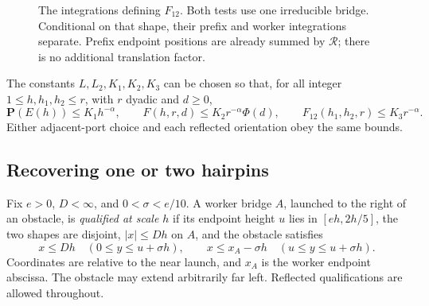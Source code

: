 \begin{figure}[ht]
\centering
{}
\caption{The integrations defining $F_{12}$. Both tests use one
irreducible bridge. Conditional on that shape, their prefix and worker
integrations separate. Prefix endpoint positions are already summed
by $\mathcal R$; there is no additional translation factor.}
\label{fig:10-probe-factors}
\end{figure}

\begin{theorem}
\label{thm:10-ordered-probes}
The constants \(L,L_2,K_1,K_2,K_3\) can be chosen so that, for all integer
\(1\le h,h_1,h_2\le r\), with \(r\) dyadic and \(d\ge0\),
\begin{equation}
 \mathbf P(E(h))\le K_1h^{-\alpha},\qquad
 F(h,r,d)\le K_2r^{-\alpha}\Phi(d),\qquad
 F_{12}(h_1,h_2,r)\le K_3r^{-\alpha}.\label{eq:T-34}
\end{equation}
Either adjacent-port choice and each reflected orientation obey the same
bounds.
\end{theorem}

\subsection{Recovering one or two hairpins}

Fix \(e>0\), \(D<\infty\), and \(0<\sigma<e/10\). A worker bridge
\(A\), launched to the right of an obstacle, is \emph{qualified at scale
\(h\)} if its endpoint height \(u\) lies in \([eh,2h/5]\), the two
shapes are disjoint, \(|x|\le Dh\) on \(A\), and the obstacle satisfies
\[
 x\le Dh\quad(0\le y\le u+\sigma h),\qquad
 x\le x_A-\sigma h\quad(u\le y\le u+\sigma h).
\]
Coordinates are relative to the near launch, and \(x_A\) is the worker
endpoint abscissa. The obstacle may extend arbitrarily far left.
Reflected qualifications are allowed throughout.

